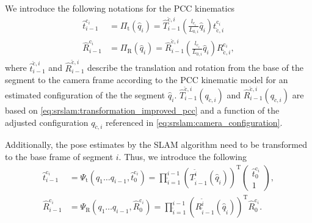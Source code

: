 We introduce the following notations for the \gls{PCC} kinematics
\begin{equation}\label{eq:srslam:Pi}
\begin{split}
    \hat{t}_{i-1}^{\mathrm{c}_i} &= \Pi_\mathrm{t}(\hat{q}_i) = 
    \hat{T}_{i-1}^{\check{\mathrm{c}},i} \left (\frac{l_{\mathrm{c}_i}}{L_{0,i}} \hat{q}_i \right )
    t_{\check{\mathrm{c}},i}^{\mathrm{c}_i}\\
    \hat{R}_{i-1}^{\mathrm{c}_i} &= \Pi_\mathrm{R}(\hat{q}_i) =
    \hat{R}_{i-1}^{\check{\mathrm{c}},i} \left (\frac{l_{\mathrm{c}_i}}{L_{0,i}} \hat{q}_i \right )
    R_{\check{\mathrm{c}},i}^{\mathrm{c}_i},
\end{split}
\end{equation}
where $\hat{t}_{i-1}^{\check{\mathrm{c}},i}$ and $\hat{R}_{i-1}^{\check{\mathrm{c}},i}$ describe the translation and rotation from the base of the segment to the camera frame according to the \gls{PCC} kinematic model for an estimated configuration of the the segment $\hat{q}_i$. $\hat{T}_{i-1}^{\check{\mathrm{c}},i}(q_{\check{c},i})$ and $\hat{R}_{i-1}^{\check{\mathrm{c}},i}(q_{\check{c},i})$ are based on \eqref{eq:srslam:transformation_improved_pcc} and a function of the adjusted configuration $q_{\check{c},i}$ referenced in \eqref{eq:srslam:camera_configuration}.

Additionally, the pose estimates by the \gls{SLAM} algorithm need to be transformed to the base frame of segment $i$. Thus, we introduce the following
\begin{equation}\label{eq:srslam:Psi}
\begin{split}
    \hat{t}_{i-1}^{\mathrm{c}_i} &= \Psi_\mathrm{t}(q_1 \dots q_{i-1}, \hat{t}_{0}^{\mathrm{c}_i}) =
    \prod_{\tilde{i}=1}^{i-1} \left ( T_{\tilde{i}-1}^{\tilde{i}} \left (\hat{q}_{\tilde{i}} \right )  \right )^\mathrm{T}
    \begin{pmatrix}
        \hat{t}_{0}^{\mathrm{c}_i}\\
        1
    \end{pmatrix},\\
    \hat{R}_{i-1}^{\mathrm{c}_i} &= \Psi_\mathrm{R}(q_1 \dots q_{i-1}, \hat{R}_{0}^{\mathrm{c}_i}) =
    \prod_{\tilde{i}=1}^{i-1} \left ( R_{\tilde{i}-1}^{\tilde{i}} \left (\hat{q}_{\tilde{i}} \right )  \right )^\mathrm{T}
    \hat{R}_{0}^{\mathrm{c}_i}.
\end{split}    
\end{equation}

